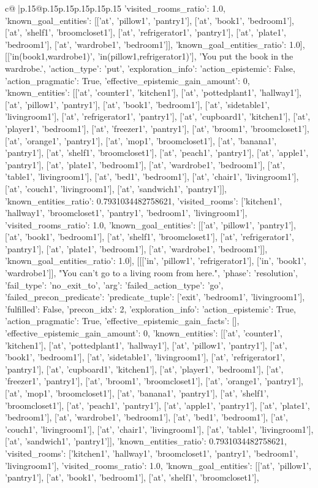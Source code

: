 \documentclass{article}
\begin{document}
{\begin{supertabular}{c@{$\;$}|p{.15\linewidth}@{}p{.15\linewidth}p{.15\linewidth}p{.15\linewidth}p{.15\linewidth}p{.15\linewidth}}
{{{'visited_rooms_ratio': 1.0, 'known_goal_entities': [['at', 'pillow1', 'pantry1'], ['at', 'book1', 'bedroom1'], ['at', 'shelf1', 'broomcloset1'], ['at', 'refrigerator1', 'pantry1'], ['at', 'plate1', 'bedroom1'], ['at', 'wardrobe1', 'bedroom1']], 'known_goal_entities_ratio': 1.0}}], [['in(book1,wardrobe1)', 'in(pillow1,refrigerator1)'], 'You put the book in the wardrobe.', {'action_type': 'put', 'exploration_info': {'action_epistemic': False, 'action_pragmatic': True, 'effective_epistemic_gain_amount': 0, 'known_entities': [['at', 'counter1', 'kitchen1'], ['at', 'pottedplant1', 'hallway1'], ['at', 'pillow1', 'pantry1'], ['at', 'book1', 'bedroom1'], ['at', 'sidetable1', 'livingroom1'], ['at', 'refrigerator1', 'pantry1'], ['at', 'cupboard1', 'kitchen1'], ['at', 'player1', 'bedroom1'], ['at', 'freezer1', 'pantry1'], ['at', 'broom1', 'broomcloset1'], ['at', 'orange1', 'pantry1'], ['at', 'mop1', 'broomcloset1'], ['at', 'banana1', 'pantry1'], ['at', 'shelf1', 'broomcloset1'], ['at', 'peach1', 'pantry1'], ['at', 'apple1', 'pantry1'], ['at', 'plate1', 'bedroom1'], ['at', 'wardrobe1', 'bedroom1'], ['at', 'table1', 'livingroom1'], ['at', 'bed1', 'bedroom1'], ['at', 'chair1', 'livingroom1'], ['at', 'couch1', 'livingroom1'], ['at', 'sandwich1', 'pantry1']], 'known_entities_ratio': 0.7931034482758621, 'visited_rooms': ['kitchen1', 'hallway1', 'broomcloset1', 'pantry1', 'bedroom1', 'livingroom1'], 'visited_rooms_ratio': 1.0, 'known_goal_entities': [['at', 'pillow1', 'pantry1'], ['at', 'book1', 'bedroom1'], ['at', 'shelf1', 'broomcloset1'], ['at', 'refrigerator1', 'pantry1'], ['at', 'plate1', 'bedroom1'], ['at', 'wardrobe1', 'bedroom1']], 'known_goal_entities_ratio': 1.0}}], [[['in', 'pillow1', 'refrigerator1'], ['in', 'book1', 'wardrobe1']], "You can't go to a living room from here.", {'phase': 'resolution', 'fail_type': 'no_exit_to', 'arg': {'failed_action_type': 'go', 'failed_precon_predicate': {'predicate_tuple': ['exit', 'bedroom1', 'livingroom1'], 'fulfilled': False, 'precon_idx': 2}}, 'exploration_info': {'action_epistemic': True, 'action_pragmatic': True, 'effective_epistemic_gain_facts': [], 'effective_epistemic_gain_amount': 0, 'known_entities': [['at', 'counter1', 'kitchen1'], ['at', 'pottedplant1', 'hallway1'], ['at', 'pillow1', 'pantry1'], ['at', 'book1', 'bedroom1'], ['at', 'sidetable1', 'livingroom1'], ['at', 'refrigerator1', 'pantry1'], ['at', 'cupboard1', 'kitchen1'], ['at', 'player1', 'bedroom1'], ['at', 'freezer1', 'pantry1'], ['at', 'broom1', 'broomcloset1'], ['at', 'orange1', 'pantry1'], ['at', 'mop1', 'broomcloset1'], ['at', 'banana1', 'pantry1'], ['at', 'shelf1', 'broomcloset1'], ['at', 'peach1', 'pantry1'], ['at', 'apple1', 'pantry1'], ['at', 'plate1', 'bedroom1'], ['at', 'wardrobe1', 'bedroom1'], ['at', 'bed1', 'bedroom1'], ['at', 'couch1', 'livingroom1'], ['at', 'chair1', 'livingroom1'], ['at', 'table1', 'livingroom1'], ['at', 'sandwich1', 'pantry1']], 'known_entities_ratio': 0.7931034482758621, 'visited_rooms': ['kitchen1', 'hallway1', 'broomcloset1', 'pantry1', 'bedroom1', 'livingroom1'], 'visited_rooms_ratio': 1.0, 'known_goal_entities': [['at', 'pillow1', 'pantry1'], ['at', 'book1', 'bedroom1'], ['at', 'shelf1', 'broomcloset1'], }}}
\end{supertabular}}
\end{document}
